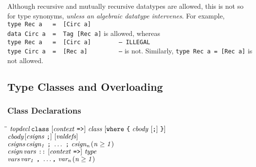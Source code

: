 Although recursive and mutually recursive datatypes are allowed,
this is not so for type synonyms, {\em unless an algebraic datatype
intervenes}.  For example,
\bprog
\mbox{\tt type\ Rec\ a\ \ \ =\ \ [Circ\ a]}\\
\mbox{\tt data\ Circ\ a\ \ =\ \ Tag\ [Rec\ a]}
\eprog
is allowed, whereas
\bprog
\mbox{\tt type\ Rec\ a\ \ \ =\ \ [Circ\ a]\ \ \ \ \ \ \ \ --\ ILLEGAL}\\
\mbox{\tt type\ Circ\ a\ \ =\ \ [Rec\ a]\ \ \ \ \ \ \ \ \ --}
\eprog
is not. Similarly, \mbox{\tt type\ Rec\ a\ =\ [Rec\ a]} is not allowed.

\subsection{Type Classes and Overloading}
\label{overloading}
\label{classes}

\subsubsection{Class Declarations}
\label{class-decls}

\begin{flushleft}\it\begin{tabbing}
\hspace{0.5in}\=\hspace{3.0in}\=\kill
$\it topdecl$\>\makebox[3.5em]{$\rightarrow$}$\it \makebox{\tt class}\ [context\ \makebox{\tt =>}]\ class\ [\makebox{\tt where}\ \makebox{\tt {\char'173}}\ cbody\ [\makebox{\tt ;}]\ \makebox{\tt {\char'175}}]$\\ 
$\it cbody$\>\makebox[3.5em]{$\rightarrow$}$\it [csigns\ \makebox{\tt ;}]\ [valdefs]$\\ 
$\it csigns$\>\makebox[3.5em]{$\rightarrow$}$\it csign_1\ \makebox{\tt ;}\ \ldots \ \makebox{\tt ;}\ csign_n$\>\makebox[3em]{}$\it (n\geq 1)$\\ 
$\it csign$\>\makebox[3.5em]{$\rightarrow$}$\it vars\ \makebox{\tt ::}\ [context\ \makebox{\tt =>}]\ type$\\ 
$\it vars$\>\makebox[3.5em]{$\rightarrow$}$\it var_1\ \makebox{\tt ,}\ \ldots \makebox{\tt ,}\ var_n$\>\makebox[3em]{}$\it (n\geq 1)$
\end{tabbing}\end{flushleft}
%
%
%
%
%

